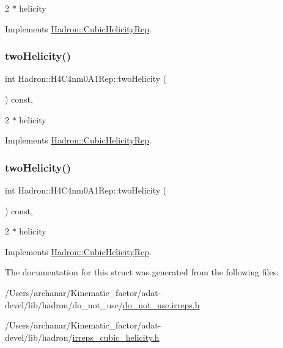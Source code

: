 2 $\ast$ helicity 

Implements \mbox{\hyperlink{structHadron_1_1CubicHelicityRep_af507aa56fc2747eacc8cb6c96db31ecc}{Hadron\+::\+Cubic\+Helicity\+Rep}}.

\mbox{\label{structHadron_1_1H4C4nm0A1Rep_a3d1124ede0ce759e05e5f9a89fd4ef55}} 
\subsubsection{\texorpdfstring{twoHelicity()}{twoHelicity()}\hspace{0.1cm}{\footnotesize\ttfamily [2/3]}}
{\footnotesize\ttfamily int Hadron\+::\+H4\+C4nm0\+A1\+Rep\+::two\+Helicity (\begin{DoxyParamCaption}{ }\end{DoxyParamCaption}) const\hspace{0.3cm}{\ttfamily [inline]}, {\ttfamily [virtual]}}

2 $\ast$ helicity 

Implements \mbox{\hyperlink{structHadron_1_1CubicHelicityRep_af507aa56fc2747eacc8cb6c96db31ecc}{Hadron\+::\+Cubic\+Helicity\+Rep}}.

\mbox{\label{structHadron_1_1H4C4nm0A1Rep_a3d1124ede0ce759e05e5f9a89fd4ef55}} 
\subsubsection{\texorpdfstring{twoHelicity()}{twoHelicity()}\hspace{0.1cm}{\footnotesize\ttfamily [3/3]}}
{\footnotesize\ttfamily int Hadron\+::\+H4\+C4nm0\+A1\+Rep\+::two\+Helicity (\begin{DoxyParamCaption}{ }\end{DoxyParamCaption}) const\hspace{0.3cm}{\ttfamily [inline]}, {\ttfamily [virtual]}}

2 $\ast$ helicity 

Implements \mbox{\hyperlink{structHadron_1_1CubicHelicityRep_af507aa56fc2747eacc8cb6c96db31ecc}{Hadron\+::\+Cubic\+Helicity\+Rep}}.



The documentation for this struct was generated from the following files\+:\begin{DoxyCompactItemize}
\item 
/\+Users/archanar/\+Kinematic\+\_\+factor/adat-\/devel/lib/hadron/do\+\_\+not\+\_\+use/\mbox{\hyperlink{adat-devel_2lib_2hadron_2do__not__use_2do__not__use_8irreps_8h}{do\+\_\+not\+\_\+use.\+irreps.\+h}}\item 
/\+Users/archanar/\+Kinematic\+\_\+factor/adat-\/devel/lib/hadron/\mbox{\hyperlink{adat-devel_2lib_2hadron_2irreps__cubic__helicity_8h}{irreps\+\_\+cubic\+\_\+helicity.\+h}}\end{DoxyCompactItemize}
